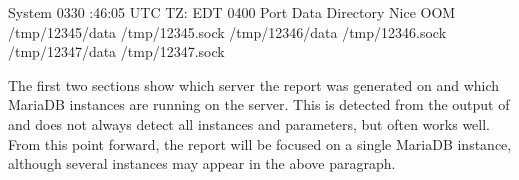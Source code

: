 \documentclass[letterpaper,10pt,english]{sphinxmanual}
\begin{document}
\begin{sphinxVerbatim}[commandchars=\\\{\}]
              System   \PYGZhy{}03\PYGZhy{}30 :46:05 UTC
                             TZ: EDT \PYGZhy{}0400
  Port  Data Directory             Nice OOM 
      
   /tmp/12345/data                   /tmp/12345.sock
   /tmp/12346/data                   /tmp/12346.sock
   /tmp/12347/data                   /tmp/12347.sock
\end{sphinxVerbatim}

The first two sections show which server the report was generated on and which
MariaDB instances are running on the server. This is detected from the output of
 and does not always detect all instances and parameters, but often works
well.  From this point forward, the report will be focused on a single MariaDB
instance, although several instances may appear in the above paragraph.
\end{document}
